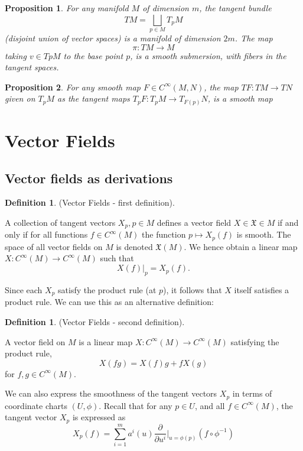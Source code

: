 \documentclass{article}
\newtheorem{proposition}{Proposition}[theorem]
\theoremstyle{definition}
\newtheorem{defn}[theorem]{Definition}
\newenvironment{definition}
  {\vspace{8pt}\begin{mdframed}[backgroundcolor=blueish]\begin{defn}}
  {\end{defn}\end{mdframed}\vspace{4pt}}
\begin{document}
\begin{proposition}
For any manifold $M$ of dimension $m$, the tangent bundle
\[
    TM = \bigsqcup_{p\in M} T_p M
\]
(disjoint union of vector spaces) is a manifold of dimension $2m$. The map 
\[
    \pi : TM \rightarrow M
\]
taking $v \in TpM$ to the base point $p$, is a smooth submersion, with fibers in the tangent spaces.

\end{proposition}

\begin{proposition}

For any smooth map $F \in C^\infty(M,N)$, the map $T F : TM \rightarrow TN$ given on $T_pM$ as the tangent maps $T_pF : T_pM \rightarrow T_{F(p)}N$, is a smooth map
\end{proposition}

\newpage 
\section{Vector Fields}

\subsection{Vector fields as derivations}
\begin{definition} (Vector Fields - first definition).

A collection of tangent vectors $X_p, p \in M$ defines a vector field $X \in \mathfrak X \in M$ if and only if for all functions $f \in C^\infty(M)$ the function $p \mapsto X_p(f)$ is smooth. The space of all vector fields on $M$ is denoted $\mathfrak X(M)$. We hence obtain a linear map $X : C^\infty(M) \rightarrow C^\infty(M)$ such that 
\[
    X (f)|_p = X_p(f).
\]
\end{definition}
Since each $X_p$ satisfy the product rule (at $p$), it follows that $X$ itself satisfies a product rule. We can use this as an alternative definition:

\begin{definition} (Vector Fields - second definition).

A vector field on $M$ is a linear map $X : C^\infty (M) \rightarrow C^\infty (M)$ satisfying the product rule, 
\[
    X(f g) = X(f)g + f X(g)
\]
for $f,g \in C^\infty(M)$.
\end{definition}

We can also express the smoothness of the tangent vectors $X_p$ in terms of coordinate charts $(U,\phi)$. Recall that for any $p \in U$, and all $f \in C^\infty(M)$, the tangent vector $X_p$ is expressed as
\[
    X_p(f) = \sum_{i=1}^m a^i (u) \frac{\partial}{\partial u^i} \Bigr |_{u=\phi(p)}  (f \circ \phi^{-1})
\]
\end{document}

